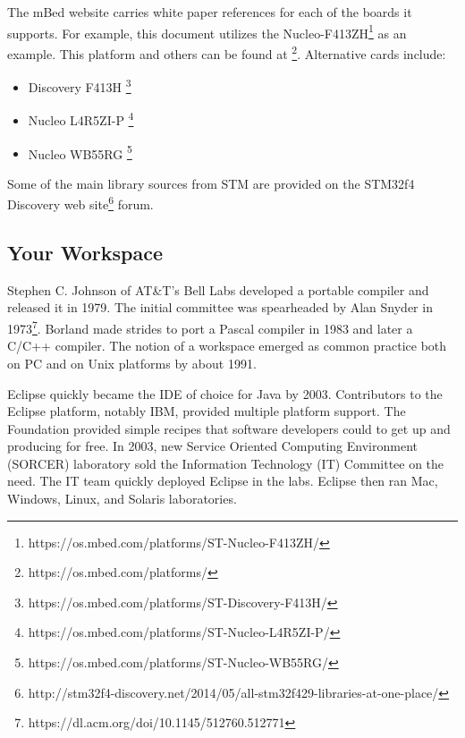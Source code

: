 \documentclass{article}
\begin{document}
The mBed website carries white paper references for each of the boards it supports.  For example, this document utilizes the Nucleo-F413ZH\footnote{https://os.mbed.com/platforms/ST-Nucleo-F413ZH/} as an example.  This platform and others can be found at \footnote{https://os.mbed.com/platforms/}.
Alternative cards include:
\begin{itemize}
	\item Discovery F413H \footnote{https://os.mbed.com/platforms/ST-Discovery-F413H/}
	\item Nucleo L4R5ZI-P \footnote{https://os.mbed.com/platforms/ST-Nucleo-L4R5ZI-P/}
	\item Nucleo WB55RG \footnote{https://os.mbed.com/platforms/ST-Nucleo-WB55RG/}
\end{itemize}

Some of the main library sources from STM are provided on the STM32f4 Discovery web site\footnote{http://stm32f4-discovery.net/2014/05/all-stm32f429-libraries-at-one-place/} forum.  




\newpage
\subsection{Your Workspace} %
\label{sub:your_workspace}

Stephen C. Johnson of AT\&T's Bell Labs developed a portable compiler and released it in 1979.  The initial committee was spearheaded by Alan Snyder in 1973\footnote{https://dl.acm.org/doi/10.1145/512760.512771}.  Borland made strides to port a Pascal compiler in 1983 and later a C/C++ compiler.  The notion of a workspace emerged as common practice both on PC and on Unix platforms by about 1991. %

Eclipse quickly became the IDE of choice for Java by 2003.  Contributors to the Eclipse platform, notably IBM, provided multiple platform support.   The Foundation provided simple recipes that software developers could to get up and producing for free.  In 2003, new Service Oriented Computing Environment (SORCER)  laboratory sold the Information Technology (IT) Committee on the need.  The IT team quickly deployed Eclipse in the labs.  Eclipse then ran Mac, Windows, Linux, and Solaris laboratories.  
\end{document}
